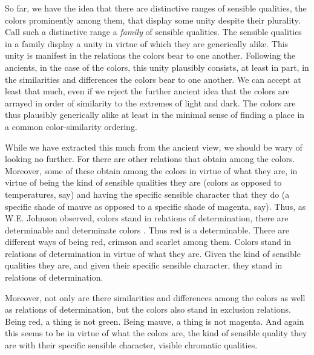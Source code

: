 \documentclass[12pt]{article}
\begin{document}
So far, we have the idea that there are distinctive ranges of sensible qualities, the colors prominently among them, that display some unity despite their plurality. Call such a distinctive range a \emph{family} of sensible qualities. The sensible qualities in a family display a unity in virtue of which they are generically alike. This unity is manifest in the relations the colors bear to one another. Following the ancients, in the case of the colors, this unity plausibly consists, at least in part, in the similarities and differences the colors bear to one another. We can accept at least that much, even if we reject the further ancient idea that the colors are arrayed in order of similarity to the extremes of light and dark. The colors are thus plausibly generically alike at least in the minimal sense of finding a place in a common color-similarity ordering. 

While we have extracted this much from the ancient view, we should be wary of looking no further. For there are other relations that obtain among the colors. Moreover, some of these obtain among the colors in virtue of what they are, in virtue of being the kind of sensible qualities they are (colors as opposed to temperatures, say) and having the specific sensible character that they do (a specific shade of mauve as opposed to a specific shade of magenta, say). Thus, as W.E. Johnson \citeyearpar{Johnson:1921fk} observed, colors stand in relations of determination, there are determinable and determinate colors \citep[for recent discussion see][]{Funkhouser:2006as}. Thus red is a determinable. There are different ways of being red, crimson and scarlet among them. Colors stand in relations of determination in virtue of what they are. Given the kind of sensible qualities they are, and given their specific sensible character, they stand in relations of determination. 

Moreover, not only are there similarities and differences among the colors as well as relations of determination, but the colors also stand in exclusion relations. Being red, a thing is not green. Being mauve, a thing is not magenta. And again this seems to be in virtue of what the colors are, the kind of sensible quality they are with their specific sensible character, visible chromatic qualities. 
\end{document}
